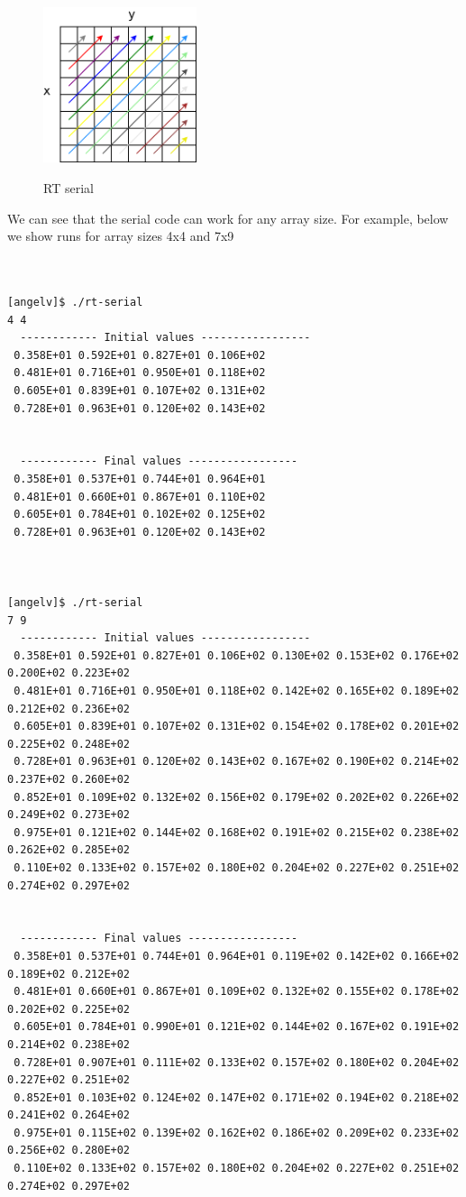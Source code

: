 \begin{figure}[!htbp]
  \centering
  \includegraphics[width=0.4\textwidth]{graphics/projects/rt-ser.png}
  \label{fig:rt-ser}
  \caption{RT serial}
\end{figure}

We can see that the serial code can work for any array size. For example, below
we show runs for array sizes 4x4 and 7x9

\begin{verbatim}


[angelv]$ ./rt-serial
4 4
  ------------ Initial values -----------------
 0.358E+01 0.592E+01 0.827E+01 0.106E+02
 0.481E+01 0.716E+01 0.950E+01 0.118E+02
 0.605E+01 0.839E+01 0.107E+02 0.131E+02
 0.728E+01 0.963E+01 0.120E+02 0.143E+02
 
 
  ------------ Final values -----------------
 0.358E+01 0.537E+01 0.744E+01 0.964E+01
 0.481E+01 0.660E+01 0.867E+01 0.110E+02
 0.605E+01 0.784E+01 0.102E+02 0.125E+02
 0.728E+01 0.963E+01 0.120E+02 0.143E+02



[angelv]$ ./rt-serial
7 9
  ------------ Initial values -----------------
 0.358E+01 0.592E+01 0.827E+01 0.106E+02 0.130E+02 0.153E+02 0.176E+02 0.200E+02 0.223E+02
 0.481E+01 0.716E+01 0.950E+01 0.118E+02 0.142E+02 0.165E+02 0.189E+02 0.212E+02 0.236E+02
 0.605E+01 0.839E+01 0.107E+02 0.131E+02 0.154E+02 0.178E+02 0.201E+02 0.225E+02 0.248E+02
 0.728E+01 0.963E+01 0.120E+02 0.143E+02 0.167E+02 0.190E+02 0.214E+02 0.237E+02 0.260E+02
 0.852E+01 0.109E+02 0.132E+02 0.156E+02 0.179E+02 0.202E+02 0.226E+02 0.249E+02 0.273E+02
 0.975E+01 0.121E+02 0.144E+02 0.168E+02 0.191E+02 0.215E+02 0.238E+02 0.262E+02 0.285E+02
 0.110E+02 0.133E+02 0.157E+02 0.180E+02 0.204E+02 0.227E+02 0.251E+02 0.274E+02 0.297E+02
 
 
  ------------ Final values -----------------
 0.358E+01 0.537E+01 0.744E+01 0.964E+01 0.119E+02 0.142E+02 0.166E+02 0.189E+02 0.212E+02
 0.481E+01 0.660E+01 0.867E+01 0.109E+02 0.132E+02 0.155E+02 0.178E+02 0.202E+02 0.225E+02
 0.605E+01 0.784E+01 0.990E+01 0.121E+02 0.144E+02 0.167E+02 0.191E+02 0.214E+02 0.238E+02
 0.728E+01 0.907E+01 0.111E+02 0.133E+02 0.157E+02 0.180E+02 0.204E+02 0.227E+02 0.251E+02
 0.852E+01 0.103E+02 0.124E+02 0.147E+02 0.171E+02 0.194E+02 0.218E+02 0.241E+02 0.264E+02
 0.975E+01 0.115E+02 0.139E+02 0.162E+02 0.186E+02 0.209E+02 0.233E+02 0.256E+02 0.280E+02
 0.110E+02 0.133E+02 0.157E+02 0.180E+02 0.204E+02 0.227E+02 0.251E+02 0.274E+02 0.297E+02
\end{verbatim}


